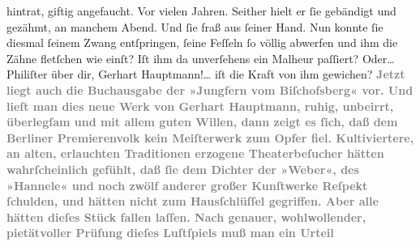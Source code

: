 \begin{ledgroupsized}[t]{13cm}
{{                  hintrat, giftig angefaucht. Vor vielen Jahren. Seither hielt er ſie gebändigt und
                  gezähmt, an manchem Abend. Und ſie fraß aus ſeiner Hand. Nun konnte ſie diesmal
                  ſeinem Zwang entſpringen, ſeine Feſſeln ſo völlig abwerfen und ihm die Zähne
                  fletſchen wie einſt? Iſt ihm da unverſehens ein Malheur paſſiert? Oder{\dots} Philiſter über dir, Gerhart Hauptmann!{\dots} iſt die Kraft von ihm
                  gewichen?}}\pend
           {\bigskip}\pstart
           \noindent{}\textcolor{gray}{\textbf{Jetzt liegt auch die Buchausgabe der »Jungfern vom Biſchofsberg« vor. Und lieſt man dies neue
                  Werk von Gerhart Hauptmann, ruhig,
                  unbeirrt, überlegſam und mit allem guten Willen, dann zeigt es ſich, daß dem Berliner Premierenvolk kein Meiſterwerk zum
                  Opfer fiel. Kultiviertere, an alten, erlauchten Traditionen erzogene
                  Theaterbeſucher hätten wahrſcheinlich gefühlt, daß ſie dem Dichter der »Weber«, des »Hannele« und noch zwölf anderer großer Kunſtwerke Reſpekt ſchulden, und
                  hätten nicht zum Hausſchlüſſel gegriffen. Aber alle hätten dieſes Stück fallen laſſen. Nach genauer,
                  wohlwollender, pietätvoller Prüfung dieſes Luſtſpiels muß man ein Urteil
}}
\end{ledgroupsized}
